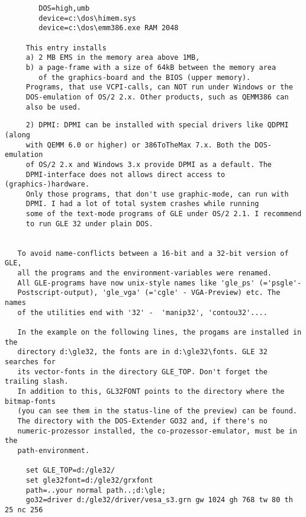 \begin{center}
\begin{minipage}[t]{11.0cm}
{\begin{verbatim}
        DOS=high,umb
        device=c:\dos\himem.sys
        device=c:\dos\emm386.exe RAM 2048
     
     This entry installs 
     a) 2 MB EMS in the memory area above 1MB,
     b) a page-frame with a size of 64kB between the memory area
        of the graphics-board and the BIOS (upper memory).
     Programs, that use VCPI-calls, can NOT run under Windows or the
     DOS-emulation of OS/2 2.x. Other products, such as QEMM386 can
     also be used.
\end{verbatim}
}
\end{minipage}
\end{center}
\clearpage
\begin{center}
\begin{minipage}[t]{11.0cm}
{\scriptsize
\begin{verbatim}
     2) DPMI: DPMI can be installed with special drivers like QDPMI (along 
     with QEMM 6.0 or higher) or 386ToTheMax 7.x. Both the DOS-emulation 
     of OS/2 2.x and Windows 3.x provide DPMI as a default. The
     DPMI-interface does not allows direct access to (graphics-)hardware.
     Only those programs, that don't use graphic-mode, can run with
     DPMI. I had a lot of total system crashes while running
     some of the text-mode programs of GLE under OS/2 2.1. I recommend
     to run GLE 32 under plain DOS.


   To avoid name-conflicts between a 16-bit and a 32-bit version of GLE,
   all the programs and the environment-variables were renamed.
   All GLE-programs have now unix-style names like 'gle_ps' (='psgle'-
   Postscript-output), 'gle_vga' (='cgle' - VGA-Preview) etc. The names
   of the utilities end with '32' -  'manip32', 'contou32'.... 
  
   In the example on the following lines, the progams are installed in the
   directory d:\gle32, the fonts are in d:\gle32\fonts. GLE 32 searches for
   its vector-fonts in the directory GLE_TOP. Don't forget the trailing slash.
   In addition to this, GL32FONT points to the directory where the bitmap-fonts
   (you can see them in the status-line of the preview) can be found.
   The directory with the DOS-Extender GO32 and, if there's no
   numeric-prozessor installed, the co-prozessor-emulator, must be in the
   path-environment.

     set GLE_TOP=d:/gle32/
     set gle32font=d:/gle32/grxfont
     path=..your normal path..;d:\gle;
     go32=driver d:/gle32/driver/vesa_s3.grn gw 1024 gh 768 tw 80 th 25 nc 256 


\end{verbatim}}
\end{minipage}
\end{center}
